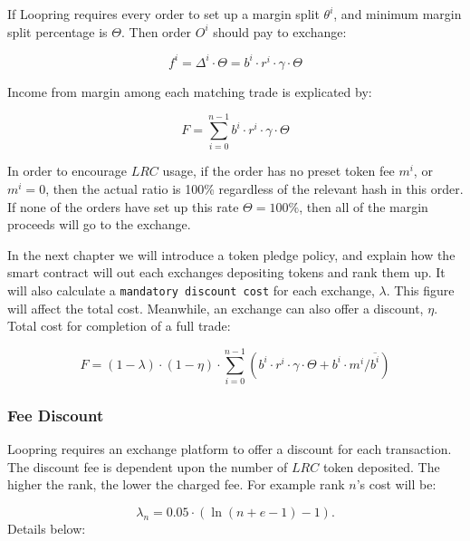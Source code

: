 \documentclass[UTF8,nofonts]{article}
\begin{document}
If Loopring requires every order to set up a margin split $\theta^i$, and minimum margin split percentage is $\Theta$. Then order $O^i$ should pay to exchange: 


\begin{equation*}
f^i = \Delta^i \cdot \Theta = b^i \cdot r^i \cdot \gamma \cdot \Theta
\end{equation*}

Income from margin among each matching trade is explicated by:

\begin{equation*}
F = \sum^{n-1}_{i=0} b^i \cdot r^i \cdot \gamma \cdot \Theta
\end{equation*}

In order to encourage $LRC$ usage, if the order has no preset token fee $m^i$, or $m^i=0$, then the actual ratio is 100\% regardless of the relevant hash in this order. If none of the orders have set up this rate $\Theta=100\%$, then all of the margin proceeds will go to the exchange.

In the next chapter we will introduce a token pledge policy, and explain how the smart contract will out each exchanges depositing tokens and rank them up. It will also calculate a \texttt{mandatory discount cost} for each exchange, $\lambda$. This figure will affect the total cost. Meanwhile, an exchange can also offer a discount, $\eta$. Total cost for completion of a full trade: 

\begin{equation*}
F =(1-\lambda)\cdot (1-\eta) \cdot \sum^{n-1}_{i=0} (b^i \cdot r^i \cdot \gamma \cdot \Theta + b^i \cdot m^i / \overline{b^i})
\end{equation*}


\subsubsection{Fee Discount}
Loopring requires an exchange platform to offer a discount for each transaction. The discount fee is dependent upon the number of $LRC$ token deposited. The higher the rank, the lower the charged fee. For example rank $n$'s cost will be:

$$\lambda_{n} = 0.05\cdot(\ln (n+e-1) - 1)\text{.}$$
Details below:
\end{document}

